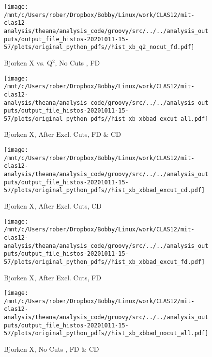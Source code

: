 \documentclass{article}
\begin{document}
\begin{landscape}
    \begin{figure}[h]
        \centering

        \texttt{[image: /mnt/c/Users/rober/Dropbox/Bobby/Linux/work/CLAS12/mit-clas12-analysis/theana/analysis\_code/groovy/src/../../analysis\_outputs/output\_file\_histos-20201011-15-57/plots/original\_python\_pdfs//hist\_xb\_q2\_nocut\_fd.pdf]}
        \captionsetup{textformat=empty,labelformat=blank}
        \caption{Bjorken X vs. Q$^{2}$, No Cuts , FD}
    \end{figure}
    \clearpage
    
    \begin{figure}[h]
        \centering

        \texttt{[image: /mnt/c/Users/rober/Dropbox/Bobby/Linux/work/CLAS12/mit-clas12-analysis/theana/analysis\_code/groovy/src/../../analysis\_outputs/output\_file\_histos-20201011-15-57/plots/original\_python\_pdfs//hist\_xb\_xbbad\_excut\_all.pdf]}
        \captionsetup{textformat=empty,labelformat=blank}
        \caption{Bjorken X, After Excl. Cuts, FD \& CD}
    \end{figure}
    \clearpage
    
    \begin{figure}[h]
        \centering

        \texttt{[image: /mnt/c/Users/rober/Dropbox/Bobby/Linux/work/CLAS12/mit-clas12-analysis/theana/analysis\_code/groovy/src/../../analysis\_outputs/output\_file\_histos-20201011-15-57/plots/original\_python\_pdfs//hist\_xb\_xbbad\_excut\_cd.pdf]}
        \captionsetup{textformat=empty,labelformat=blank}
        \caption{Bjorken X, After Excl. Cuts, CD}
    \end{figure}
    \clearpage
    
    \begin{figure}[h]
        \centering

        \texttt{[image: /mnt/c/Users/rober/Dropbox/Bobby/Linux/work/CLAS12/mit-clas12-analysis/theana/analysis\_code/groovy/src/../../analysis\_outputs/output\_file\_histos-20201011-15-57/plots/original\_python\_pdfs//hist\_xb\_xbbad\_excut\_fd.pdf]}
        \captionsetup{textformat=empty,labelformat=blank}
        \caption{Bjorken X, After Excl. Cuts, FD}
    \end{figure}
    \clearpage
    
    \begin{figure}[h]
        \centering

        \texttt{[image: /mnt/c/Users/rober/Dropbox/Bobby/Linux/work/CLAS12/mit-clas12-analysis/theana/analysis\_code/groovy/src/../../analysis\_outputs/output\_file\_histos-20201011-15-57/plots/original\_python\_pdfs//hist\_xb\_xbbad\_nocut\_all.pdf]}
        \captionsetup{textformat=empty,labelformat=blank}
        \caption{Bjorken X, No Cuts , FD \& CD}
    \end{figure}
    \clearpage
    

\end{landscape}
\end{document}
